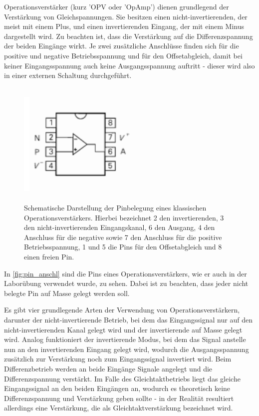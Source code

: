 Operationsverstärker (kurz 'OPV oder 'OpAmp') dienen grundlegend der Verstärkung von 
Gleichspannungen. Sie besitzen einen nicht-invertierenden, der meist mit einem 
Plus, und einen invertierenden Eingang, der mit einem Minus dargestellt wird. Zu 
beachten ist, dass die Verstärkung auf die Differenzspannung der beiden Eingänge 
wirkt. Je zwei zusätzliche Anschlüsse finden sich für die positive und negative 
Betriebsspannung und für den Offsetabgleich, damit bei keiner Eingangsspannung 
auch keine Ausgangsspannung auftritt - dieser wird also in einer externen 
Schaltung durchgeführt.

\begin{figure}[H]
    \centering
    \includegraphics[width=6cm, height=6cm,keepaspectratio]{./figures/pics/pins.PNG}
    \caption{Schematische Darstellung der Pinbelegung eines klassischen Operationsverstärkers. Hierbei bezeichnet 2 den invertierenden, 3 den nicht-invertierenden Eingangskanal, 6 den Ausgang, 4 den Anschluss für die negative sowie 7 den Anschluss für die positive Betriebsspannung, 1 und 5 die Pins für den Offsetabgleich und 8 einen freien Pin.  \cite{tietze}}
    \label{fig:pin_anschl}
\end{figure}

In \autoref{fig:pin_anschl} sind die Pins eines Operationsverstärkers, wie er auch 
in der Laborübung verwendet wurde, zu sehen. Dabei ist zu beachten, dass jeder nicht 
belegte Pin auf Masse gelegt werden soll.

Es gibt vier grundlegende Arten der Verwendung von Operationsverstärkern, darunter
der nicht-invertierende Betrieb, bei dem das Eingangssignal nur auf den nicht-invertierenden 
Kanal gelegt wird und der invertierende auf Masse gelegt wird. Analog funktioniert der invertierende 
Modus, bei dem das Signal anstelle nun an den invertierenden Eingang gelegt wird, wodurch die Ausgangsspannung 
zusätzlich zur Verstärkung noch zum Eingangssignal invertiert wird. Beim Differenzbetrieb werden an 
beide Eingänge Signale angelegt und die Differenzspannung verstärkt. Im Falle des Gleichtaktbetriebs 
liegt das gleiche Eingangssignal an den beiden Eingängen an, wodurch es theoretisch keine Differenzspannung 
und Verstärkung geben sollte - in der Realität resultiert allerdings eine Verstärkung, die als 
Gleichtaktverstärkung bezeichnet wird.

